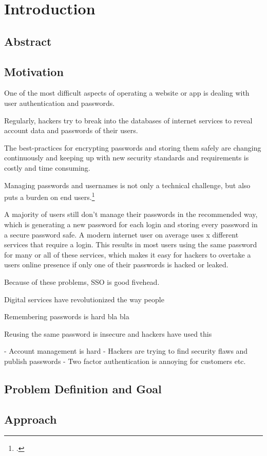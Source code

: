 \section{Introduction}
\subsection{Abstract}

\subsection{Motivation}

One of the most difficult aspects of operating a website or app is dealing with user
authentication and passwords.

Regularly, hackers try to break into the databases of internet services to reveal account data and 
passwords of their users.

The best-practices for encrypting passwords and storing them safely are changing
continuously and keeping up with new security standards and requirements is costly and time consuming.

Managing passwords and usernames is not only a technical challenge, but also puts a burden
on end users.\footcite[Cp. ][p. 459]{Hoonakker2009}

A majority of users still don't manage their passwords in the recommended way, which is
generating a new password for each login and storing every password in a secure password safe.
A modern internet user on average uses x different services that require a login.
This results in most users using the same password for many or all of these services,
which makes it easy for hackers to overtake a users online presence if only one of their
passwords is hacked or leaked.

Because of these problems, SSO is good fivehead.







Digital services have revolutionized the way people 


Remembering passwords is hard bla bla

Reusing the same password is insecure and hackers have used this



- Account management is hard
- Hackers are trying to find security flaws and publish passwords
- Two factor authentication is annoying for customers etc.


\subsection{Problem Definition and Goal}

\subsection{Approach}
